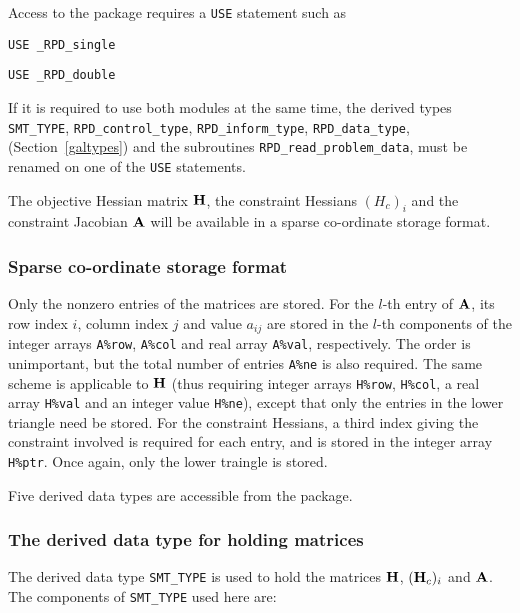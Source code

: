 \documentclass{galahad}
\newcommand{\packagename}{RPD}
\newcommand{\fullpackagename}{\libraryname\_\packagename}
\begin{document}
Access to the package requires a {\tt USE} statement such as

\medskip{}

\hskip0.5in {\tt USE \fullpackagename\_single}

\medskip{}

\hskip0.5in {\tt USE  \fullpackagename\_double}

\medskip

\noindent
If it is required to use both modules at the same time, the derived types
{\tt SMT\_TYPE},
{\tt \packagename\_control\_type},
{\tt \packagename\_inform\_type},
{\tt \packagename\_data\_type},
(Section~\ref{galtypes})
and the subroutines
{\tt \packagename\_read\_problem\_data},
must be renamed on one of the {\tt USE} statements.


\galmatrix
The objective Hessian matrix ${\mathbf{H}}$, the constraint Hessians $(H_c)_i$ and
the constraint Jacobian ${\mathbf{A}}$ will be available in a sparse co-ordinate
storage format.

\subsubsection{Sparse co-ordinate storage format}\label{coordinate}
Only the nonzero entries of the matrices are stored. For the
$l$-th entry of ${\mathbf{A}}$, its row index $i$, column index $j$
and value $a_{ij}$
are stored in the $l$-th components of the integer arrays {\tt A\%row},
{\tt A\%col} and real array {\tt A\%val}, respectively.
The order is unimportant, but the total
number of entries {\tt A\%ne} is also required.
The same scheme is applicable to
${\mathbf{H}}$ (thus requiring integer arrays {\tt H\%row}, {\tt H\%col}, a real array
{\tt H\%val} and an integer value {\tt H\%ne}),
except that only the entries in the lower triangle need be stored.
For the constraint Hessians, a third index giving the constraint involved
is required for each entry, and is stored in the integer array
{\tt H\%ptr}. Once again, only the lower traingle is stored.


\galtypes
Five derived data types are accessible from the package.


\subsubsection{The derived data type for holding matrices}\label{typesmt}
The derived data type {\tt SMT\_TYPE} is used to hold the matrices
${\mathbf{H}}$, $({\mathbf{H}}_c)_i$ and ${\mathbf{A}}$.
The components of {\tt SMT\_TYPE} used here are:
\end{document}
